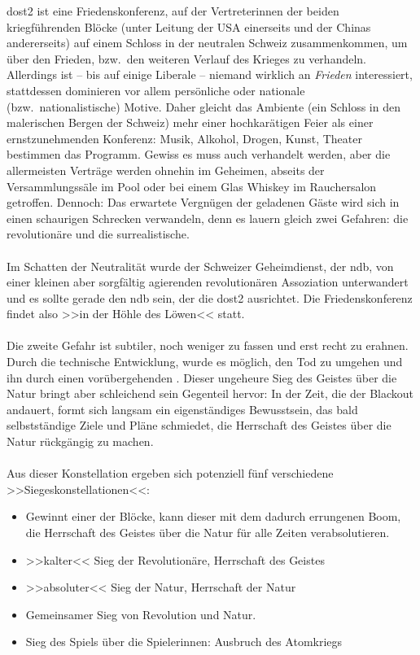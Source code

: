 \ac{dost2} ist eine Friedenskonferenz, auf der Vertreterinnen der beiden
kriegführenden Blöcke (unter Leitung der USA einerseits und der Chinas
andererseits) auf einem Schloss in der neutralen Schweiz zusammenkommen, 
um über den Frieden, bzw.~den weiteren Verlauf des Krieges zu verhandeln.
Allerdings ist -- bis auf einige Liberale -- niemand wirklich an \emph{Frieden}
interessiert, stattdessen dominieren vor allem persönliche oder nationale
(bzw.~nationalistische) Motive. Daher gleicht das Ambiente (ein Schloss in den
malerischen Bergen der Schweiz) mehr einer hochkarätigen Feier als einer
ernstzunehmenden Konferenz: Musik, Alkohol, Drogen, Kunst, Theater bestimmen das
Programm. Gewiss es muss auch verhandelt werden, aber die allermeisten Verträge
werden ohnehin im Geheimen, abseits der Versammlungssäle im Pool oder bei einem
Glas Whiskey im Rauchersalon getroffen. Dennoch: Das erwartete Vergnügen der
geladenen Gäste wird sich in einen schaurigen Schrecken verwandeln, denn es
lauern gleich zwei Gefahren: die revolutionäre und die surrealistische.\\\\
%
Im Schatten der Neutralität wurde der Schweizer Geheimdienst, der \ac{ndb}, von
einer kleinen aber sorgfältig agierenden revolutionären Assoziation
unterwandert und es sollte gerade den \ac{ndb} sein, der die \ac{dost2}
ausrichtet. Die Friedenskonferenz findet also >>in der Höhle des Löwen<<
statt.\\\\
%
Die zweite Gefahr ist subtiler, noch weniger zu fassen und erst recht zu
erahnen. Durch die technische Entwicklung, wurde es möglich, den Tod zu umgehen
und ihn durch einen vorübergehenden  . Dieser
ungeheure Sieg des Geistes über die Natur bringt aber schleichend sein
Gegenteil hervor: In der Zeit, die der Blackout andauert, formt sich langsam ein
eigenständiges Bewusstsein, das bald selbstständige Ziele und Pläne schmiedet,
die Herrschaft des Geistes über die Natur rückgängig zu machen.\\\\
%
Aus dieser Konstellation ergeben sich potenziell fünf verschiedene
>>Siegeskonstellationen<<: 
\begin{itemize} 
  \item[] Gewinnt einer der Blöcke, kann dieser mit dem dadurch errungenen Boom,
    die Herrschaft des Geistes über die Natur für alle Zeiten verabsolutieren.
  \item[] >>kalter<< Sieg der Revolutionäre, Herrschaft des Geistes
  \item[] >>absoluter<< Sieg der Natur, Herrschaft der Natur
  \item[] Gemeinsamer Sieg von Revolution und Natur. 
  \item[] Sieg des Spiels über die Spielerinnen: Ausbruch des Atomkriegs
\end{itemize}
